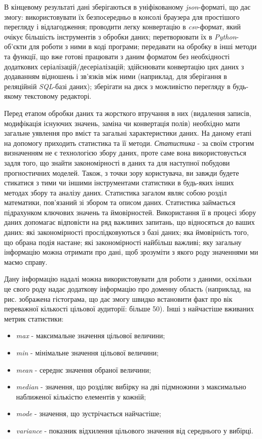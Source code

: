В кінцевому результаті дані зберігаються в уніфікованому \textit{json}-форматі, що дає змогу: використовувати їх безпосередньо в консолі браузера для простішого перегляду і відлагодження; проводити легку конвертацію в \textit{csv}-формат, який очікує більшість інструментів з обробки даних; перетворювати їх в \textit{Python}-об'єкти для роботи з ними в коді програми; передавати на обробку в інші методи та функції, що вже готові працювати з даним форматом без необхідності додаткових серіалізацій/десеріалізацій; здійснювати конвертацію цих даних з додаванням відношень і зв'язків між ними (наприклад, для зберігання в реляційній \textit{SQL}-базі даних); зберігати на диск з можливістю перегляду в будь-якому текстовому редакторі.

Перед етапом обробки даних та жорсткого втручання в них (видалення записів, модифікація існуючих значень, заміна чи конвертація полів) необхідно мати загальне уявлення про вміст та загальні характеристики даних. На даному етапі на допомогу приходить статистика та її методи.
\textit{Статистика} - за своїм строгим визначенням не є технологією збору даних, проте саме вона використовується задля того, що знайти закономірності в даних та для наступної побудови прогностичних моделей. Також, з точки зору користувача, ви завжди будете стикатися з тими чи іншими інструментами статистики в будь-яких інших методах збору та аналізу даних. Статистика загалом являє собою розділ математики, пов'язаний зі збором та описом даних. Статистика займається підрахунком ключових значень та ймовірностей. Використання її в процесі збору даних допомагає відповісти на ряд важливих запитань, що відносяться до ваших даних: які закономірності прослідковуються з базі даних; яка ймовірність того, що обрана подія настане; які закономірності найбільш важливі; яку загальну інформацію можна отримати про дані, щоб зрозуміти з якого роду значеннями ми маємо справу.

Дану інформацію надалі можна використовувати для роботи з даними, оскільки це свого роду надає додаткову інформацію про доменну область (наприклад, на рис. зображена гістограма, що дає змогу швидко встановити факт про вік переважної кількості цільової аудиторії: більше 50). Інші з найчастіше вживаних метрик статистики:
\begin{itemize}
	\item \textit{max} - максимальне значення цільової величини;
	\item \textit{min} - мінімальне значення цільової величини;
	\item \textit{mean} - середнє значення обраної величини;
	\item \textit{median} - значення, що розділяє вибірку на дві підмножини з максимально наближеної кількістю елементів у кожній;
	\item \textit{mode} - значення, що зустрічається найчастіше;
	\item \textit{variance} - показник відхилення цільового значення від середнього у вибірці.
\end{itemize}

